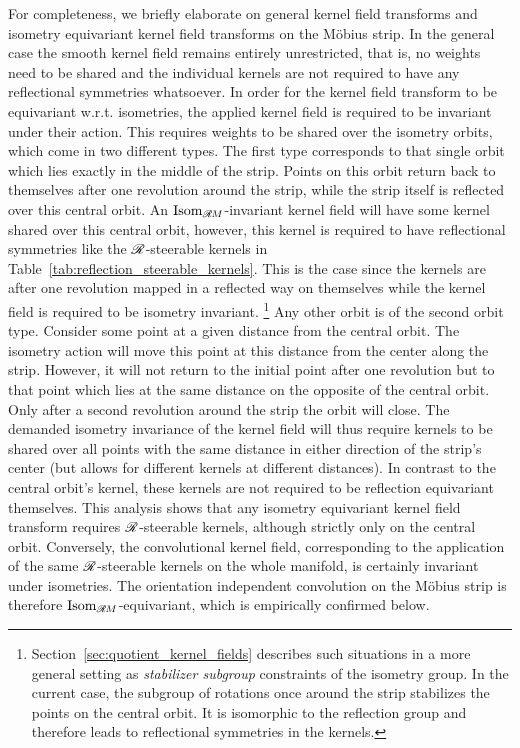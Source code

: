 For completeness, we briefly elaborate on general kernel field transforms and isometry equivariant kernel field transforms on the M\"obius strip.
In the general case the smooth kernel field remains entirely unrestricted, that is, no weights need to be shared and the individual kernels are not required to have any reflectional symmetries whatsoever.
In order for the kernel field transform to be equivariant w.r.t. isometries, the applied kernel field is required to be invariant under their action.
This requires weights to be shared over the isometry orbits, which come in two different types.
The first type corresponds to that single orbit which lies exactly in the middle of the strip.
Points on this orbit return back to themselves after one revolution around the strip, while the strip itself is reflected over this central orbit.
An $\operatorname{Isom}_{\mathscr{R}\mkern-1.8muM}$-invariant kernel field will have some kernel shared over this central orbit, however, this kernel is required to have reflectional symmetries like the $\mathscr{R}$-steerable kernels in Table~\ref{tab:reflection_steerable_kernels}.
This is the case since the kernels are after one revolution mapped in a reflected way on themselves while the kernel field is required to be isometry invariant.%
\footnote{
    Section~\ref{sec:quotient_kernel_fields} describes such situations in a more general setting as \emph{stabilizer subgroup} constraints of the isometry group.
    In the current case, the subgroup of rotations once around the strip stabilizes the points on the central orbit.
    It is isomorphic to the reflection group and therefore leads to reflectional symmetries in the kernels.
}
Any other orbit is of the second orbit type.
Consider some point at a given distance from the central orbit.
The isometry action will move this point at this distance from the center along the strip.
However, it will not return to the initial point after one revolution but to that point which lies at the same distance on the opposite of the central orbit.
Only after a second revolution around the strip the orbit will close.
The demanded isometry invariance of the kernel field will thus require kernels to be shared over all points with the same distance in either direction of the strip's center (but allows for different kernels at different distances).
In contrast to the central orbit's kernel, these kernels are not required to be reflection equivariant themselves.
This analysis shows that any isometry equivariant kernel field transform requires $\mathscr{R}$-steerable kernels, although strictly only on the central orbit.
Conversely, the convolutional kernel field, corresponding to the application of the same $\mathscr{R}$-steerable kernels on the whole manifold, is certainly invariant under isometries.
The orientation independent convolution on the M\"obius strip is therefore $\operatorname{Isom}_{\mathscr{R}\mkern-1.8muM}$-equivariant, which is empirically confirmed below.
















